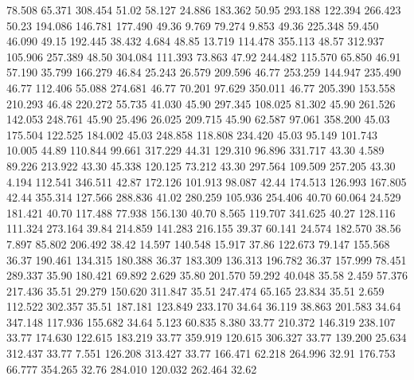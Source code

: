   78.508   65.371  308.454        51.02
  58.127   24.886  183.362        50.95
 293.188  122.394  266.423        50.23
 194.086  146.781  177.490        49.36
   9.769   79.274    9.853        49.36
 225.348   59.450   46.090        49.15
 192.445   38.432    4.684        48.85
  13.719  114.478  355.113        48.57
 312.937  105.906  257.389        48.50
 304.084  111.393   73.863        47.92
 244.482  115.570   65.850        46.91
  57.190   35.799  166.279        46.84
  25.243   26.579  209.596        46.77
 253.259  144.947  235.490        46.77
 112.406   55.088  274.681        46.77
  70.201   97.629  350.011        46.77
 205.390  153.558  210.293        46.48
 220.272   55.735   41.030        45.90
 297.345  108.025   81.302        45.90
 261.526  142.053  248.761        45.90
  25.496   26.025  209.715        45.90
  62.587   97.061  358.200        45.03
 175.504  122.525  184.002        45.03
 248.858  118.808  234.420        45.03
  95.149  101.743   10.005        44.89
 110.844   99.661  317.229        44.31
 129.310   96.896  331.717        43.30
   4.589   89.226  213.922        43.30
  45.338  120.125   73.212        43.30
 297.564  109.509  257.205        43.30
   4.194  112.541  346.511        42.87
 172.126  101.913   98.087        42.44
 174.513  126.993  167.805        42.44
 355.314  127.566  288.836        41.02
 280.259  105.936  254.406        40.70
  60.064   24.529  181.421        40.70
 117.488   77.938  156.130        40.70
   8.565  119.707  341.625        40.27
 128.116  111.324  273.164        39.84
 214.859  141.283  216.155        39.37
  60.141   24.574  182.570        38.56
   7.897   85.802  206.492        38.42
  14.597  140.548   15.917        37.86
 122.673   79.147  155.568        36.37
 190.461  134.315  180.388        36.37
 183.309  136.313  196.782        36.37
 157.999   78.451  289.337        35.90
 180.421   69.892    2.629        35.80
 201.570   59.292   40.048        35.58
   2.459   57.376  217.436        35.51
  29.279  150.620  311.847        35.51
 247.474   65.165   23.834        35.51
   2.659  112.522  302.357        35.51
 187.181  123.849  233.170        34.64
  36.119   38.863  201.583        34.64
 347.148  117.936  155.682        34.64
   5.123   60.835    8.380        33.77
 210.372  146.319  238.107        33.77
 174.630  122.615  183.219        33.77
 359.919  120.615  306.327        33.77
 139.200   25.634  312.437        33.77
   7.551  126.208  313.427        33.77
 166.471   62.218  264.996        32.91
 176.753   66.777  354.265        32.76
 284.010  120.032  262.464        32.62
